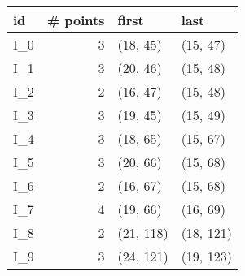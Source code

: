 \begin{tabular}{lrll}
\toprule
   id &  \# points &      first &       last \\
\midrule
 I\_0 &          3 &   (18, 45) &   (15, 47) \\
 I\_1 &          3 &   (20, 46) &   (15, 48) \\
 I\_2 &          2 &   (16, 47) &   (15, 48) \\
 I\_3 &          3 &   (19, 45) &   (15, 49) \\
 I\_4 &          3 &   (18, 65) &   (15, 67) \\
 I\_5 &          3 &   (20, 66) &   (15, 68) \\
 I\_6 &          2 &   (16, 67) &   (15, 68) \\
 I\_7 &          4 &   (19, 66) &   (16, 69) \\
 I\_8 &          2 &  (21, 118) &  (18, 121) \\
 I\_9 &          3 &  (24, 121) &  (19, 123) \\
\bottomrule
\end{tabular}
